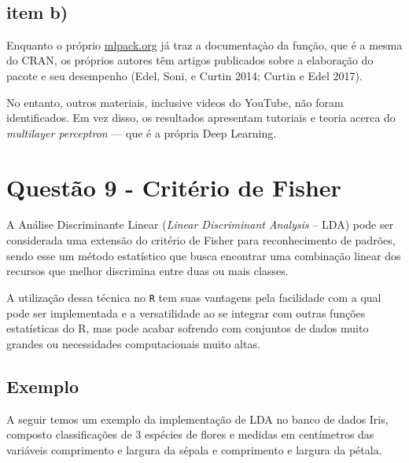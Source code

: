 \documentclass[
  a4paperpaper,
]{article}
\begin{document}
~

\subsection{item b)}\label{item-b}

Enquanto o próprio
\href{https://www.mlpack.org/doc/mlpack-git/r_documentation.html\#perceptron}{mlpack.org}
já traz a documentaçào da função, que é a mesma do CRAN, os próprios
autores têm artigos publicados sobre a elaboração do pacote e seu
desempenho (Edel, Soni, e Curtin 2014; Curtin e Edel 2017).

No entanto, outros materiais, inclusive videos do YouTube, não foram
identificados. Em vez disso, os resultados apresentam tutoriais e teoria
acerca do \emph{multilayer perceptron} --- que é a própria Deep
Learning.

\newpage{}

\section{Questão 9 - Critério de
Fisher}\label{questuxe3o-9---crituxe9rio-de-fisher}

A Análise Discriminante Linear (\emph{Linear Discriminant Analysis} --
LDA) pode ser considerada uma extensão do critério de Fisher para
reconhecimento de padrões, sendo esse um método estatístico que busca
encontrar uma combinação linear dos recursos que melhor discrimina entre
duas ou mais classes.

A utilização dessa técnica no \texttt{R} tem suas vantagens pela
facilidade com a qual pode ser implementada e a versatilidade ao se
integrar com outras funções estatísticas do R, mas pode acabar sofrendo
com conjuntos de dados muito grandes ou necessidades computacionais
muito altas.

\subsection{Exemplo}\label{exemplo-3}

A seguir temos um exemplo da implementação de LDA no banco de dados
Iris, composto classificações de 3 espécies de flores e medidas em
centímetros das variáveis comprimento e largura da sépala e comprimento
e largura da pétala.
\end{document}
